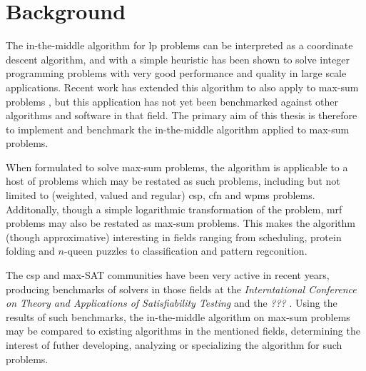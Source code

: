 \section{Background}
The in-the-middle algorithm \parencite{Wedelin95} for \acrlong{lp} problems can be interpreted as a coordinate descent algorithm, and with a simple heuristic has been shown to solve integer programming problems with very good performance and quality in large scale applications.
Recent work has extended this algorithm to also apply to max-sum problems \parencite{Wedelin13}, but this application has not yet been benchmarked against other algorithms and software in that field.
The primary aim of this thesis is therefore to implement and benchmark the in-the-middle algorithm applied to max-sum problems.

When formulated to solve max-sum problems, the algorithm is applicable to a host of problems which may be restated as such problems, including but not limited to (weighted, valued and regular) \gls{csp}, \gls{cfn} and \gls{wpms} problems.
Additonally, though a simple logarithmic transformation of the problem, \gls{mrf} problems may also be restated as max-sum problems.
This makes the algorithm (though approximative) interesting in fields ranging from scheduling, protein folding and \(n\)-queen puzzles to classification and pattern regconition.

The \gls{csp} and max-SAT communities have been very active in recent years, producing benchmarks of solvers in those fields at the \emph{Interntational Conference on Theory and Applications of Satisfiability Testing} \parencite{Argelich11} and the \emph{???} \parencites{Allouche14b}{deGivry14}.
Using the results of such benchmarks, the in-the-middle algorithm on max-sum problems may be compared to existing algorithms in the mentioned fields, determining the interest of futher developing, analyzing or specializing the algorithm for such problems.
